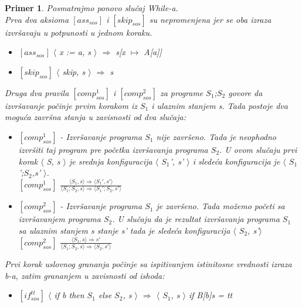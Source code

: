 \documentclass[a4paper]{article}
\newtheorem{primer}{Primer}[section]
\begin{document}
\begin{primer} Posmatrajmo ponovo slučaj \textit{While-a}.\\
Prva dva aksioma $[ass_{sos}]$ i $[skip_{sos}]$  su nepromenjena jer se oba izraza izvršavaju u potpunosti u jednom koraku.
\begin{itemize}
	\item $[ass_{sos}]$ \hspace{1cm} $\langle$ \textit{x := a, s} $\rangle$ $\Longrightarrow$ \textit{s}[\textit{x $\mapsto$ A}[\textit{a}]]
	\item $[skip_{sos}]$ \hspace{1cm} $\langle$ skip, \textit{s} $\rangle$ $\Longrightarrow$ \textit{s}
\end{itemize} 
Druga dva pravila $[comp^{1}_{sos}]$ i $[comp^{2}_{sos}]$ za programe $S_1$;$S_2$ govore da izvršavanje počinje prvim korakom iz $S_1$ i ulaznim stanjem s. Tada postoje dva moguća završna stanja u zavisnosti od dva slučaja:
\begin{itemize}
	\item $[comp^{1}_{sos}]$ - Izvršavanje programa $S_1$ nije završeno. Tada je neophodno izvršiti taj program pre početka izvršavanja programa $S_2$. U ovom slučaju prvi korak $\langle$ \textit{S, s} $\rangle$ je srednja konfiguracija  $\langle$ \textit{$S_1$', s'} $\rangle$ i sledeća konfiguracija je  $\langle$ \textit{$S_1$';$S_2$,s'} $\rangle$.\\
	$[comp^1_{sos}]$ \hspace{1cm} {\large $\frac{\langle S_1, s \rangle \Longrightarrow \langle S_1', s' \rangle}{\langle S_1;S_2,s \rangle \Longrightarrow \langle S_1';S_2,s' \rangle}$}
	\item $[comp^2_{sos}]$ - Izvršavanje programa $S_1$  je završeno. Tada možemo početi sa izvršavanjem programa $S_2$. U slučaju da je rezultat izvršavanja programa $S_1$ sa ulaznim stanjem s stanje s' tada je sledeća konfiguracija $\langle$ $S_2$, s'$\rangle$ \\
	$[comp^2_{sos}]$ \hspace{1cm}  {\large $\frac{\langle S_1, s \rangle \Longrightarrow s'}{\langle S_1;S_2,s \rangle \Longrightarrow \langle S_2, s'\rangle}$}
\end{itemize} 
Prvi korak uslovnog grananja počinje sa ispitivanjem istinitosne vrednosti izraza \textit{b}-a, zatim grananjem u zavisnosti od ishoda:
\begin{itemize}
	\item $[if^{tt}_{sos}]$ $\langle$ if b then $S_1$ else $S_2$, s $\rangle$ $\Longrightarrow$ $\langle$ $S_1$, s $\rangle$ \hspace{1cm} if B[b]s = tt

\end{itemize}
\end{primer}
\end{document}
